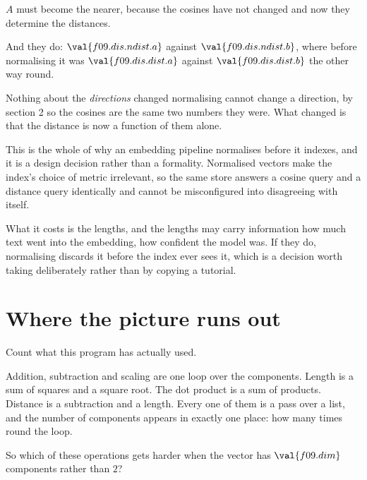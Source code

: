 \begin{fr}
\begin{ansblock}
$A$ must become the nearer, because the cosines have not changed and now they
determine the distances.
\end{ansblock}

And they do: $\val{f09.dis.ndist.a}$ against $\val{f09.dis.ndist.b}$, where
before normalising it was $\val{f09.dis.dist.a}$ against
$\val{f09.dis.dist.b}$ the other way round.

Nothing about the \emph{directions} changed \dash{} normalising cannot change
a direction, by section 2 \dash{} so the cosines are the same two numbers they
were. What changed is that the distance is now a function of them alone.

\begin{aibox}
This is the whole of why an embedding pipeline normalises before it indexes,
and it is a design decision rather than a formality. Normalised vectors make
the index's choice of metric irrelevant, so the same store answers a cosine
query and a distance query identically and cannot be misconfigured into
disagreeing with itself.

What it costs is the lengths, and the lengths may carry information \dash{}
how much text went into the embedding, how confident the model was. If they
do, normalising discards it before the index ever sees it, which is a decision
worth taking deliberately rather than by copying a tutorial.
\end{aibox}
\end{fr}

\section{Where the picture runs out}
\label{sec:F09-highdim}

\begin{fr}
Count what this program has actually used.

Addition, subtraction and scaling are one loop over the components. Length is
a sum of squares and a square root. The dot product is a sum of products.
Distance is a subtraction and a length. Every one of them is a pass over a
list, and the number of components appears in exactly one place: how many
times round the loop.

So which of these operations gets harder when the vector has
$\val{f09.dim}$ components rather than $2$?
\nextframe
\end{fr}

